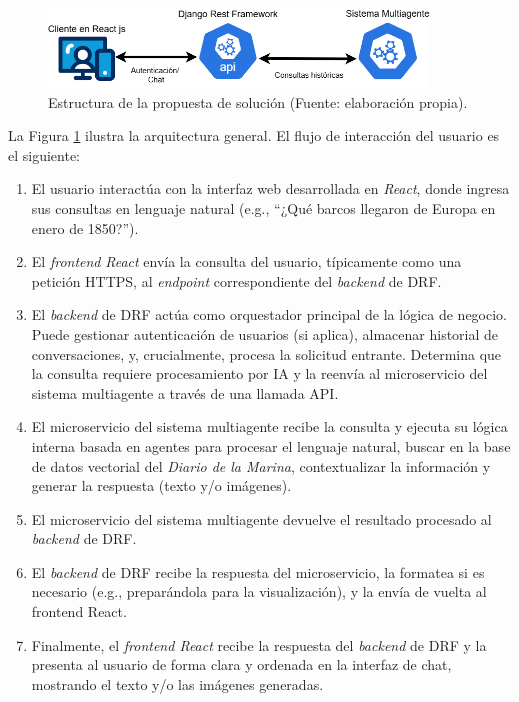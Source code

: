 \begin{figure}[htbp] %
	\centering
	\includegraphics[width=0.9\textwidth]{images/micro.png} 
	\caption{Estructura de la propuesta de solución (Fuente: elaboración propia).}
	\label{fig:arquitectura_web}
\end{figure}

La Figura \ref{fig:arquitectura_web} ilustra la arquitectura general. El flujo de interacción del usuario es el siguiente:

\begin{enumerate}
	\item El usuario interactúa con la interfaz web desarrollada en \textit{React}, donde ingresa sus consultas en lenguaje natural (e.g., “¿Qué barcos llegaron de Europa en enero de 1850?”).
	\item El \textit{frontend} \textit{React} envía la consulta del usuario, típicamente como una petición HTTPS, al \textit{endpoint} correspondiente del \textit{backend} de DRF.
	\item El \textit{backend} de DRF actúa como orquestador principal de la lógica de negocio. Puede gestionar autenticación de usuarios (si aplica), almacenar historial de conversaciones, y, crucialmente, procesa la solicitud entrante. Determina que la consulta requiere procesamiento por IA y la reenvía al microservicio del sistema multiagente a través de una llamada API.
	\item El microservicio del sistema multiagente recibe la consulta y ejecuta su lógica interna basada en agentes para procesar el lenguaje natural, buscar en la base de datos vectorial del \textit{Diario de la Marina}, contextualizar la información y generar la respuesta (texto y/o imágenes).
	\item El microservicio del sistema multiagente devuelve el resultado procesado al \textit{backend} de DRF.
	\item El \textit{backend} de DRF recibe la respuesta del microservicio, la formatea si es necesario (e.g., preparándola para la visualización), y la envía de vuelta al frontend React.
	\item Finalmente, el \textit{frontend React} recibe la respuesta del \textit{backend} de DRF y la presenta al usuario de forma clara y ordenada en la interfaz de chat, mostrando el texto y/o las imágenes generadas.
\end{enumerate}

